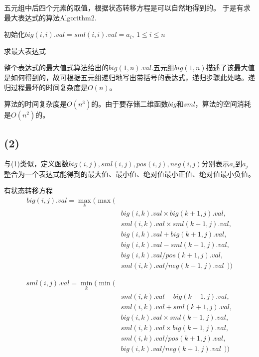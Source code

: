 \documentclass{ctexart}
\begin{document}
五元组中后四个元素的取值，根据状态转移方程是可以自然地得到的。
于是有求最大表达式的算法Algorithm2.


\begin{algorithm}[H]
  \SetAlgoLined

  初始化$big(i,i).val=sml(i,i).val=a_i,\ 1\le i \le n$\;
  \caption{求最大表达式}
\end{algorithm}

整个表达式的最大值式算法给出的$big(1,n).val$.五元组$big(1,n)$描述了该最大值是如何得到的，故可根据五元组递归地写出带括号的表达式，递归步骤此处略。递归过程最坏的时间复杂度是$O(n)$。

算法的时间复杂度是$O(n^3)$的。由于要存储二维函数$big$和$sml$，算法的空间消耗是$O(n^2)$的。

\subsection*{(2)}

与(1)类似，定义函数$big(i,j),sml(i,j),pos(i,j),neg(i,j)$分别表示$a_i$到$a_j$整合为一个表达式能得到的最大值、最小值、绝对值最小正值、绝对值最小负值。

有状态转移方程
$$
\begin{aligned}
big(i,j).val = \max _k ( \max ( & \\
  & big(i,k).val \times big(k+1,j).val,\\
  & sml(i,k).val \times sml(k+1,j).val,\\
  & big(i,k).val + big(k+1,j).val,\\
  & big(i,k).val - sml(k+1,j).val,\\
  & big(i,k).val / pos(k+1,j).val,\\
  & sml(i,k).val / neg(k+1,j).val \ \  )  )
\end{aligned}
$$

$$
\begin{aligned}
sml(i,j).val = \min _k ( \min ( & \\
  & sml(i,k).val - big(k+1,j).val,\\
  & sml(i,k).val + sml(k+1,j).val,\\
  & big(i,k).val \times sml(k+1,j).val,\\
  & sml(i,k).val \times big(k+1,j).val,\\
  & sml(i,k).val / pos(k+1,j).val,\\
  & big(i,k).val / neg(k+1,j).val  \ \  )  )
\end{aligned}
$$
\end{document}
